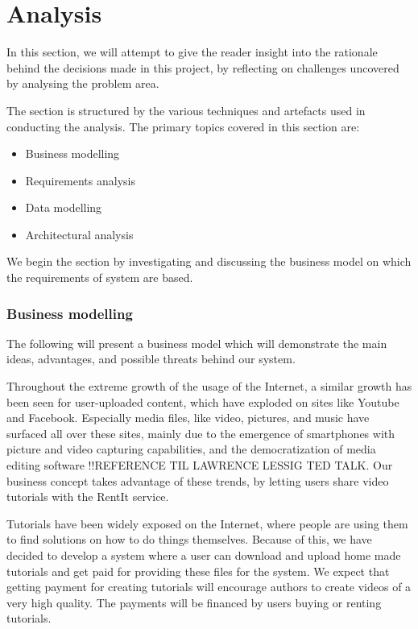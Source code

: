 \part{Analysis}
In this section, we will attempt to give the reader insight into the rationale behind the decisions made in this project, by reflecting on challenges uncovered by analysing the problem area. 

The section is structured by the various techniques and artefacts used in conducting the analysis. The primary topics covered in this section are:
\begin{itemize}
\item Business modelling
\item Requirements analysis
\item Data modelling
\item Architectural analysis
\end{itemize}
We begin the section by investigating and discussing the business model on which the requirements of system are based.

\section{Business modelling} \label{BusinessModel}
The following will present a business model which will demonstrate the main ideas, advantages, and possible threats behind our system.

Throughout the extreme growth of the usage of the Internet, a similar growth has been seen for user-uploaded content, which have exploded on sites like Youtube and Facebook. Especially media files, like video, pictures, and music have surfaced all over these sites, mainly due to the emergence of smartphones with picture and video capturing capabilities, and the democratization of media editing software !!REFERENCE TIL LAWRENCE LESSIG TED TALK. Our business concept takes advantage of these trends, by letting users share video tutorials with the RentIt service.

Tutorials have been widely exposed on the Internet, where people are using them to find solutions on how to do things themselves. Because of this, we have decided to develop a system where a user can download and upload home made tutorials and get paid for providing these files for the system. We expect that getting payment for creating tutorials will encourage authors to create videos of a very high quality. The payments will be financed by users buying or renting tutorials.

